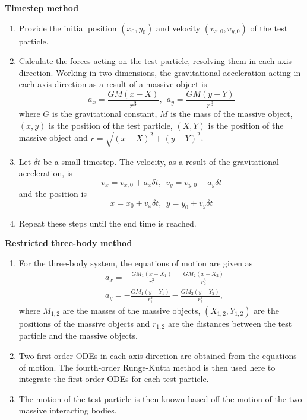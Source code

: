 \documentclass[twoside,twocolumn]{article}
\begin{document}
    \noindent \textbf{Timestep method}
    \begin{enumerate}
        \item Provide the initial position $(x_0, y_0)$ and velocity $(v_{x,0}, v_{y,0})$ of the test particle.
        \item Calculate the forces acting on the test particle, resolving them in each axis direction. Working in two dimensions, the gravitational acceleration acting in each axis direction as a result of a massive object is
        \begin{equation}
            a_{x} = \frac{GM(x - X)}{r^3}, \ \ a_{y} = \frac{GM(y - Y)}{r^3}
            \label{eqn:acceleration}
        \end{equation}
        where $G$ is the gravitational constant, $M$ is the mass of the massive object, $(x, y)$ is the position of the test particle, $(X, Y)$ is the position of the massive object and $r = \sqrt{(x - X)^2 + (y - Y)^2}$. 
        \item Let $\delta t$ be a small timestep. The velocity, as a result of the gravitational acceleration, is
        \begin{equation}
            v_x = v_{x,0} + a_{x} \delta t, \ \ v_y = v_{y,0} + a_{y} \delta t
        \end{equation}
        and the position is
        \begin{equation}
            x = x_0 + v_x \delta t, \ \ y = y_0 + v_y \delta t
        \end{equation}
        \item Repeat these steps until the end time is reached.
    \end{enumerate}
    \vspace{0.2cm}

    \noindent \textbf{Restricted three-body method}
    \begin{enumerate}
        \item For the three-body system, the equations of motion are given as \cite{three_body}
        \begin{equation}
            \begin{split}
                &a_{x} = - \frac{GM_1(x - X_1)}{r_1^3} - \frac{GM_2(x - X_2)}{r_2^3} \\
                &a_{y} = - \frac{GM_1(y - Y_1)}{r_1^3} - \frac{GM_2(y - Y_2)}{r_2^3},
            \end{split}
        \end{equation}
        where $M_{1,2}$ are the masses of the massive objects, $(X_{1, 2}, Y_{1, 2})$ are the positions of the massive objects and $r_{1, 2}$ are the distances between the test particle and the massive objects. 
        \item Two first order ODEs in each axis direction are obtained from the equations of motion. The fourth-order Runge-Kutta method is then used here to integrate the first order ODEs for each test particle.
        \item The motion of the test particle is then known based off the motion of the two massive interacting bodies.
    \end{enumerate}
    
\end{document}
